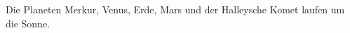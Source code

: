 \documentclass{article}
\begin{document}
\thispagestyle{empty}
\sffamily
\LARGE
\pagecolor{black}
\color{white}
\noindent
Die Planeten Merkur, Venus, Erde, Mars und der Halleysche Komet
laufen um die Sonne\color{bunt}.
\end{document}
